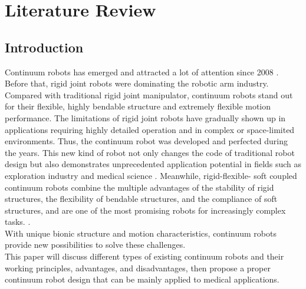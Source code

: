 \section{Literature Review} 
\subsection{Introduction}
Continuum robots has emerged and attracted a lot of attention since 2008 \cite{review_2008}. Before that, rigid joint robots were
dominating the robotic arm industry. Compared with traditional rigid 
joint manipulator, continuum robots stand out for their flexible, highly bendable structure and extremely flexible motion 
performance. The limitations of rigid joint robots have gradually shown up 
in applications requiring highly detailed operation and in complex or space-limited environments. Thus, the continuum robot
was developed and perfected during the years. This new kind of robot not only changes the code of traditional robot design but also demonstrates unprecedented 
application potential in fields such as exploration industry and medical science \cite{CR_medical_application}. Meanwhile, rigid-flexible-
soft coupled continuum robots combine the multiple advantages of the stability of rigid structures, the flexibility of bendable 
structures, and the compliance of soft structures, and are one of the most promising robots for increasingly complex tasks. 
\cite{fishboneCR}. \\
With unique bionic structure 
and motion characteristics, continuum robots provide new possibilities to solve these challenges. \\
This paper will discuss different types of existing continuum robots and their working principles, advantages, and disadvantages, 
then propose a proper continuum robot design that can be mainly applied to medical applications.
